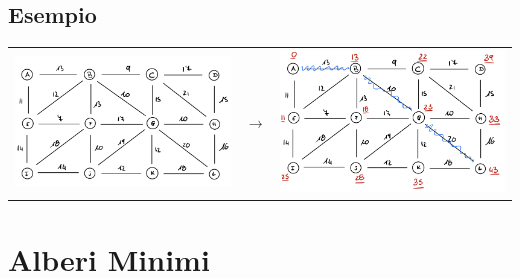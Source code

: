 \documentclass[12pt,a4paper]{article}
\begin{document}
\subsection{Esempio}
\begin{center}
\begin{tabular}{l c l}
\parbox{0.4\columnwidth}{\includegraphics[width=0.4\columnwidth]{img/spp_es.jpg}} &
\parbox{0.05\columnwidth}{$\longrightarrow$} & \parbox{0.4\columnwidth}{\includegraphics[width=0.4\columnwidth]{img/spp_es_sol.jpg}}\\
\end{tabular}
\end{center}


\clearpage
\section{Alberi Minimi}
\end{document}
